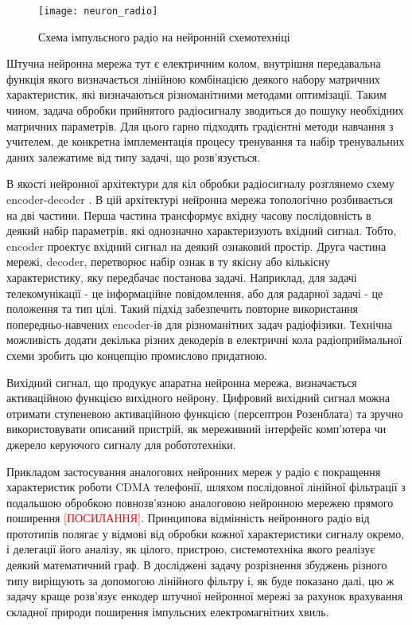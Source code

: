 \begin{figure}[htbp] \begin{center}
\texttt{[image: neuron\_radio]}
\caption{Схема імпульсного радіо на нейронній схемотехніці} 
\label{fig:neural_radio}
\end{center} \end{figure}

Штучна нейронна мережа тут є електричним колом, внутрішня передавальна 
функція якого визначається лінійною комбінацією деякого набору матричних 
характеристик, які визначаються різноманітними методами оптимізації. Таким 
чином, задача обробки прийнятого радіосигналу зводиться до пошуку необхідних 
матричних параметрів. Для цього гарно підходять градієнтні методи навчання 
з учителем, де конкретна імплементація процесу тренування та набір 
тренувальних даних залежатиме від типу задачі, що розв'язується.

В якості нейронної архітектури для кіл обробки радіосигналу розглянемо
схему encoder-decoder \cite{imp:Ying2017}. 
В цій архітектурі нейронна мережа топологічно розбивається на 
дві частини. Перша частина трансформує вхідну часову послідовність в деякий 
набір параметрів, які однозначно характеризують вхідний сигнал. Тобто, 
encoder проектує вхідний сигнал на деякий ознаковий
простір. Друга частина мережі, decoder, перетворює набір ознак в ту якісну 
або кількісну характеристику, яку передбачає постанова задачі. Наприклад,
для задачі телекомунікації - це інформаційне повідомлення, або для радарної 
задачі - це положення та тип цілі. Такий підхід забезпечить повторне 
використання попередньо-навчених encoder-ів для різноманітних задач 
радіофізики. Технічна можливість додати декілька різних декодерів в 
електричні кола радіоприймальної схеми зробить цю концепцію промислово 
придатною.

Вихідний сигнал, що продукує апаратна нейронна мережа, визначається 
активаційною функцією вихідного нейрону. Цифровий вихідний сигнал можна 
отримати ступеневою активаційною функцією (персептрон Розенблата) та зручно 
використовувати описаний пристрій, як мереживний інтерфейс комп'ютера чи 
джерело керуючого сигналу для робототехніки.

Прикладом застосування аналогових нейронних мереж у радіо є покращення 
характеристик роботи CDMA телефонії, шляхом послідовної лінійної фільтрації
з подальшою обробкою повнозв'язною аналоговою нейронною мережею прямого 
поширення \textcolor{red}{[ПОСИЛАННЯ]}. Принципова відмінність нейронного
радіо від прототипів полягає у відмові від обробки кожної характеристики 
сигналу окремо, і делегації його аналізу, як цілого, пристрою, системотехніка 
якого реалізує деякий математичний граф. В досліджені 
\cite{imp:Zhang2009} задачу розрізнення збуджень різного типу 
виріщують за допомогою лінійного фільтру і, як буде показано далі, цю ж 
задачу краще розв'язує енкодер штучної нейронної мережі за рахунок 
врахування складної природи поширення імпульсних електромагнітних 
хвиль.

